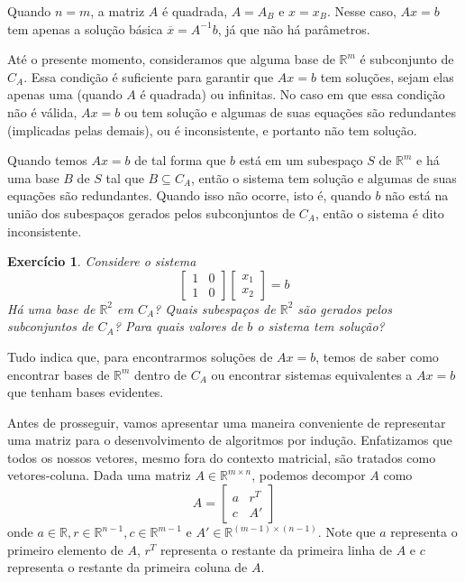 \documentclass[]{article}
\newtheorem{exercicio}{Exercício}
\numberwithin{equation}{section}
\begin{document}
Quando $n = m$, a matriz $A$ é quadrada, $A = A_B$ e $x = x_B$. Nesse caso, $Ax = b$ tem apenas a solução básica $\overline{x} = A^{-1} b$, já que não há parâmetros.

Até o presente momento, consideramos que alguma base de $\mathbb{R}^m$ é subconjunto de $C_A$. Essa condição é suficiente para garantir que $Ax = b$ tem soluções, sejam elas apenas uma (quando $A$ é quadrada) ou infinitas. No caso em que essa condição não é válida, $Ax = b$ ou tem solução e algumas de suas equações são redundantes (implicadas pelas demais), ou é inconsistente, e portanto não tem solução.

Quando temos $Ax = b$ de tal forma que $b$ está em um subespaço $S$ de $\mathbb{R}^m$ e há uma base $B$ de $S$ tal que $B \subseteq C_A$, então o sistema tem solução e algumas de suas equações são redundantes. Quando isso não ocorre, isto é, quando $b$ não está na união dos subespaços gerados pelos subconjuntos de $C_A$, então o sistema é dito inconsistente.

\begin{exercicio}
	Considere o sistema
	$$
	\begin{bmatrix}
	1 & 0 \\
	1 & 0
	\end{bmatrix}
	\begin{bmatrix}
	x_1 \\
	x_2
	\end{bmatrix}
	= b
	$$
	Há uma base de $\mathbb{R}^2$ em $C_A$? Quais subespaços de $\mathbb{R}^2$ são gerados pelos subconjuntos de $C_A$? Para quais valores de $b$ o sistema tem solução?
\end{exercicio}

Tudo indica que, para encontrarmos soluções de $Ax = b$, temos de saber como encontrar bases de $\mathbb{R}^m$ dentro de $C_A$ ou encontrar sistemas equivalentes a $Ax = b$ que tenham bases evidentes.

Antes de prosseguir, vamos apresentar uma maneira conveniente de representar uma matriz para o desenvolvimento de algoritmos por indução. Enfatizamos que todos os nossos vetores, mesmo fora do contexto matricial, são tratados como vetores-coluna. Dada uma matriz $A \in \mathbb{R}^{m \times n}$, podemos decompor $A$ como
$$
A =
\begin{bmatrix}
a & r^T \\
c & A'
\end{bmatrix}
$$
onde $a \in \mathbb{R}, r \in \mathbb{R}^{n - 1}, c \in \mathbb{R}^{m - 1}$ e $A' \in \mathbb{R}^{(m - 1) \times (n - 1)}$. Note que $a$ representa o primeiro elemento de $A$, $r^T$ representa o restante da primeira linha de $A$ e $c$ representa o restante da primeira coluna de $A$.
\end{document}

